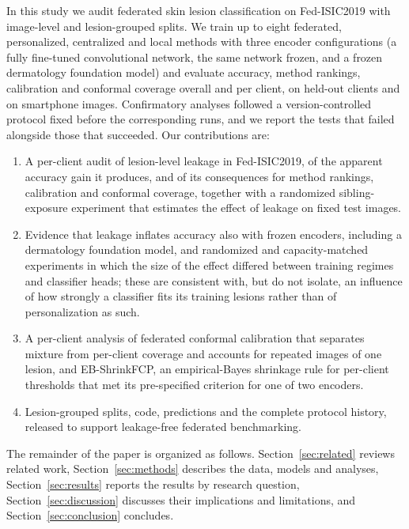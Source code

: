 \documentclass[VANCOUVER,Times1COL]{WileyNJDv5}
\begin{document}
In this study we audit federated skin lesion classification on Fed-ISIC2019 with image-level and
lesion-grouped splits. We train up to eight federated, personalized, centralized and local methods with
three encoder configurations (a fully fine-tuned convolutional network, the same network frozen, and a
frozen dermatology foundation model) and evaluate accuracy, method rankings, calibration and conformal
coverage overall and per client, on held-out clients and on smartphone images. Confirmatory analyses
followed a version-controlled protocol fixed before the corresponding runs, and we report the tests that
failed alongside those that succeeded. Our contributions are:
\begin{enumerate}
  \item A per-client audit of lesion-level leakage in Fed-ISIC2019, of the apparent accuracy gain it
    produces, and of its consequences for method rankings, calibration and conformal coverage, together
    with a randomized sibling-exposure experiment that estimates the effect of leakage on fixed test
    images.
  \item Evidence that leakage inflates accuracy also with frozen encoders, including a dermatology
    foundation model, and randomized and capacity-matched experiments in which the size of the effect
    differed between training regimes and classifier heads; these are consistent with, but do not
    isolate, an influence of how strongly a classifier fits its training lesions rather than of
    personalization as such.
  \item A per-client analysis of federated conformal calibration that separates mixture from per-client
    coverage and accounts for repeated images of one lesion, and EB-ShrinkFCP, an empirical-Bayes
    shrinkage rule for per-client thresholds that met its pre-specified criterion for one of two encoders.
  \item Lesion-grouped splits, code, predictions and the complete protocol history, released to support
    leakage-free federated benchmarking.
\end{enumerate}

The remainder of the paper is organized as follows. Section~\ref{sec:related} reviews related work,
Section~\ref{sec:methods} describes the data, models and analyses, Section~\ref{sec:results} reports the
results by research question, Section~\ref{sec:discussion} discusses their implications and limitations,
and Section~\ref{sec:conclusion} concludes.
\end{document}
